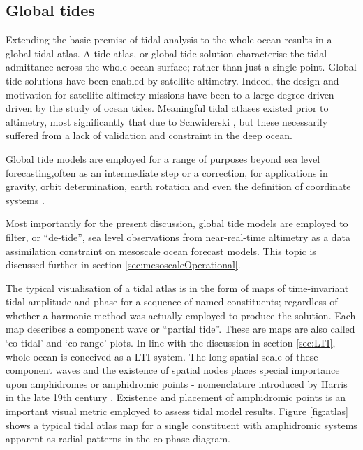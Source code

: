 \subsection{Global tides}
\label{sec:spatialTides}
Extending the basic premise of tidal analysis to the whole ocean results in a global tidal atlas.  A tide atlas, or global tide solution characterise the tidal admittance across the whole ocean surface; rather than just a single point.
Global tide solutions have been enabled by satellite altimetry.
Indeed, the design and motivation for satellite altimetry missions have been to a large degree driven driven by the study of ocean tides.
Meaningful tidal atlases existed prior to altimetry, most significantly that due to Schwiderski \citep{Schwiderski:1983ke}, but these necessarily suffered from a lack of validation and constraint in the deep ocean.


Global tide models are employed for a range of purposes beyond sea level forecasting,often as an intermediate step or a correction, for applications in gravity, orbit determination, earth rotation and even the definition of coordinate systems \citep{IERS2003}.

Most importantly for the present discussion, global tide models are employed to filter, or ``de-tide'', sea level observations from near-real-time altimetry as a data assimilation constraint on mesoscale ocean forecast models.   This topic is discussed further in section \ref{sec:mesoscaleOperational}.


The typical visualisation of a tidal atlas is in the form of maps of time-invariant tidal amplitude and phase for a sequence of named constituents; regardless of whether a harmonic method was actually employed to produce the solution.   Each map describes a component wave or ``partial tide''.  These are maps are also called `co-tidal' and `co-range' plots.
In line with the discussion in section \ref{sec:LTI}, whole ocean is conceived as a LTI system. 
The long spatial scale of these component waves and the existence of spatial nodes places special importance upon amphidromes or amphidromic points - nomenclature introduced by Harris in the late 19th century \citep[pp 119]{Cartwright:2000tt}.  Existence and placement of amphidromic points is an important visual metric employed to assess tidal model results.  
Figure \ref{fig:atlas} shows a typical tidal atlas map for a single constituent with amphidromic systems apparent as radial patterns in the co-phase diagram.

